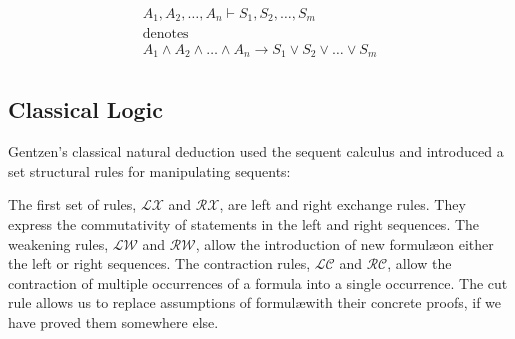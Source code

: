   \[
    \begin{array}{c}
    A_1,A_2,\dots,A_n \vdash S_1,S_2,\dots,S_m \\
      \text{denotes} \\
    A_1 \wedge A_2 \wedge \dots \wedge A_n \to S_1 \lor S_2 \lor \dots \lor S_m \\
    \end{array}
  \]

  \subsection{Classical Logic}\label{sec:classical-logic}
  
  Gentzen's classical natural deduction used the sequent calculus and introduced a set structural rules for manipulating sequents:
  
  
  The first set of rules, $\mathcal{LX}$ and $\mathcal{RX}$, are left and right exchange rules. 
  They express the commutativity of statements in the left and right sequences.
  The weakening rules, $\mathcal{LW}$ and $\mathcal{RW}$, allow the introduction of new formul\ae on either the left or right sequences.
  The contraction rules, $\mathcal{LC}$ and $\mathcal{RC}$, allow the contraction of multiple occurrences of a formula into a single occurrence. 
  The cut rule allows us to replace assumptions of formul\ae with their concrete proofs, if we have proved them somewhere else.
  
